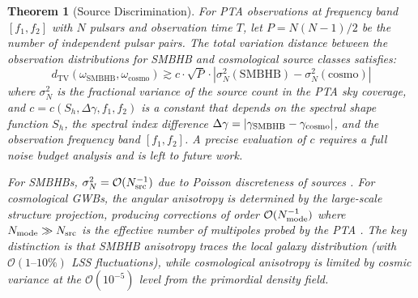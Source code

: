 \documentclass[11pt,a4paper]{article}
\newtheorem{theorem}{Theorem}[section]
\begin{document}
\begin{theorem}[Source Discrimination]\label{thm:discrimination}
For PTA observations at frequency band $[f_1, f_2]$ with $N$ pulsars and observation time $T$, let $P = N(N-1)/2$ be the number of independent pulsar pairs. The total variation distance between the observation distributions for SMBHB and cosmological source classes satisfies:
\begin{equation}\label{eq:dTV-scaling}
d_{\mathrm{TV}}(\omega_{\mathrm{SMBHB}}, \omega_{\mathrm{cosmo}}) \gtrsim c \cdot \sqrt{P} \cdot \left| \sigma_N^2(\mathrm{SMBHB}) - \sigma_N^2(\mathrm{cosmo}) \right|
\end{equation}
where $\sigma_N^2$ is the fractional variance of the source count in the PTA sky coverage, and $c = c(S_h, \Delta\gamma, f_1, f_2)$ is a constant that depends on the spectral shape function $S_h$, the spectral index difference $\Delta\gamma = |\gamma_{\rm SMBHB} - \gamma_{\rm cosmo}|$, and the observation frequency band $[f_1, f_2]$. A precise evaluation of $c$ requires a full noise budget analysis and is left to future work.

For SMBHBs, $\sigma_N^2 = \mathcal{O}(N_{\rm src}^{-1})$ due to Poisson discreteness of sources \cite{Lin:2026}. For cosmological GWBs, the angular anisotropy is determined by the large-scale structure projection, producing corrections of order $\mathcal{O}(N_{\rm mode}^{-1})$ where $N_{\rm mode} \gg N_{\rm src}$ is the effective number of multipoles probed by the PTA \cite{Grimm:2025}. The key distinction is that SMBHB anisotropy traces the local galaxy distribution (with $\mathcal{O}(1\text{--}10\%)$ LSS fluctuations), while cosmological anisotropy is limited by cosmic variance at the $\mathcal{O}(10^{-5})$ level from the primordial density field.
\end{theorem}
\end{document}
